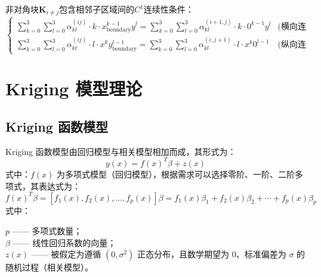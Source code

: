 非对角块$\mathbf{K}_{i\neq j}$包含相邻子区域间的$C^1$连续性条件：
\[
\begin{cases}
\sum_{k=0}^3\sum_{l=0}^3 \alpha_{kl}^{(ij)} \cdot k \cdot x_{\mathrm{boundary}}^{k-1} y^l = \sum_{k=0}^3\sum_{l=0}^3 \alpha_{kl}^{(i+1,j)} \cdot k \cdot 0^{k-1} y^l & \text{(横向连续性)} \\
\sum_{k=0}^3\sum_{l=0}^3 \alpha_{kl}^{(ij)} \cdot l \cdot x^k y_{\mathrm{boundary}}^{l-1} = \sum_{k=0}^3\sum_{l=0}^3 \alpha_{kl}^{(i,j+1)} \cdot l \cdot x^k 0^{l-1} & \text{(纵向连续性)}
\end{cases}
\]


\section{Kriging 模型理论}
\subsection{Kriging 函数模型}

Kriging 函数模型由回归模型与相关模型相加而成，其形式为：
\begin{equation}
    y(x) = f(x)^T \beta + z(x)
    \label{eq:2.1}
\end{equation}
式中：\( f(x) \) 为多项式模型（回归模型），根据需求可以选择零阶、一阶、二阶多项式，其表达式为：
\begin{equation}
    f(x)^T \beta = [f_1(x), f_2(x), \ldots, f_p(x)] \beta = f_1(x) \beta_1 + f_2(x) \beta_2 + \cdots + f_p(x) \beta_p
    \label{eq:2.2}
\end{equation}
式中：

\( p \) —— 多项式数量；\\
\( \beta \) —— 线性回归系数的向量；\\
\( z(x) \) —— 被假定为遵循 \( (0, \sigma^2) \) 正态分布，且数学期望为 0、标准偏差为 \( \sigma \) 的随机过程（相关模型）。

